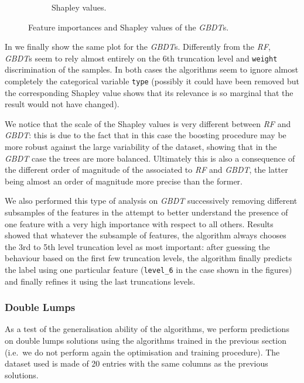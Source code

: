 \begin{figure}[htbp]
\begin{subfigure}{0.45\textwidth}
    \caption{Shapley values.}
  \end{subfigure}
  \caption{Feature importances and Shapley values of the \emph{GBDT}s.}
  \label{fig:lumps:grd_bst}
\end{figure}

In  we finally show the same plot for the \emph{GBDT}s.
Differently from the \emph{RF}, \emph{GBDT}s seem to rely almost entirely on the 6th truncation level and \texttt{weight} discrimination of the samples.
In both cases the algorithms seem to ignore almost completely the categorical variable \texttt{type} (possibly it could have been removed but the corresponding Shapley value shows that its relevance is so marginal that the result would not have changed).

We notice that the scale of the Shapley values is very different between \emph{RF} and \emph{GBDT}: this is due to the fact that in this case the boosting procedure may be more robust against the large variability of the dataset, showing that in the \emph{GBDT} case the trees are more balanced.
Ultimately this is also a consequence of the different order of magnitude of the \mse associated to \emph{RF} and \emph{GBDT}, the latter being almost an order of magnitude more precise than the former.

We also performed this type of analysis on \emph{GBDT} successively removing different subsamples of the features in the attempt to better understand the presence of one feature with a very high importance with respect to all others.
Results showed that whatever the subsample of features, the algorithm always chooses the 3rd to 5th level truncation level as most important: after guessing the behaviour based on the first few truncation levels, the algorithm finally predicts the label using one particular feature (\texttt{level\_6} in the case shown in the figures) and finally refines it using the last truncations levels.


\subsubsection{Double Lumps}

As a test of the generalisation ability of the algorithms, we perform predictions on double lumps solutions using the algorithms trained in the previous section (i.e.\ we do not perform again the optimisation and training procedure).
The dataset used is made of 20 entries with the same columns as the previous solutions.

